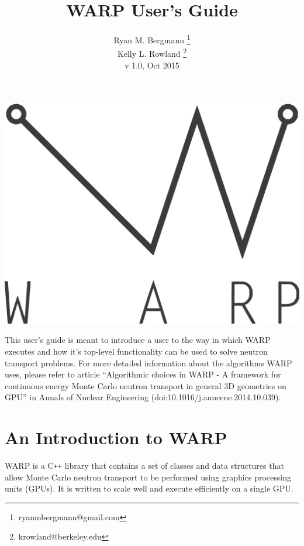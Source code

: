 \documentclass[twoside,a4paper]{refart}
\title{WARP User's Guide}
\author{Ryan M. Bergmann \thanks{ryanmbergmann@gmail.com} \\
Kelly L. Rowland \thanks{krowland@berkeley.edu}\\
v 1.0,  Oct 2015}
\date{}
\begin{document}
\maketitle

%
%

\includegraphics[width=\linewidth]{graphics/warp-vec.eps}

\vspace*{\fill} %

This user's guide is meant to introduce a user to the way in which WARP executes and how it's top-level functionality can be used to solve neutron transport problems.  For more detailed information about the algorithms WARP uses, please refer to article ``Algorithmic choices in WARP - A framework for continuous energy
Monte Carlo neutron transport in general 3D geometries on GPU'' in Annals of Nuclear Engineering (doi:10.1016/j.anucene.2014.10.039).

\vfill


\newpage
\tableofcontents
\newpage



\section{An Introduction to WARP}

WARP is a C\texttt{++} library that contains a set of classes and data structures that allow Monte Carlo neutron transport to be performed using graphics processing units (GPUs).  It is written to scale well and execute efficiently on a single GPU.
\end{document}
